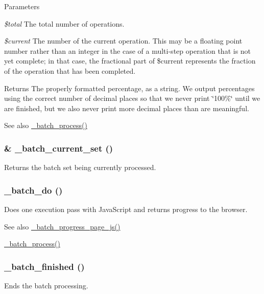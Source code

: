 \begin{DoxyParams}{Parameters}
\item[{\em \$total}]The total number of operations. \item[{\em \$current}]The number of the current operation. This may be a floating point number rather than an integer in the case of a multi-\/step operation that is not yet complete; in that case, the fractional part of \$current represents the fraction of the operation that has been completed.\end{DoxyParams}
\begin{DoxyReturn}{Returns}
The properly formatted percentage, as a string. We output percentages using the correct number of decimal places so that we never print \char`\"{}100\%\char`\"{} until we are finished, but we also never print more decimal places than are meaningful.
\end{DoxyReturn}
\begin{DoxySeeAlso}{See also}
\hyperlink{batch_8inc_af411ff0cae660684809c5f6a8dbc0353}{\_\-batch\_\-process()} 
\end{DoxySeeAlso}
\hypertarget{batch_8inc_a1a536764a1a9bf283bcceddc03b462d7}{
\subsubsection[{\_\-batch\_\-current\_\-set}]{\setlength{\rightskip}{0pt plus 5cm}\& \_\-batch\_\-current\_\-set ()}}
\label{batch_8inc_a1a536764a1a9bf283bcceddc03b462d7}
Returns the batch set being currently processed. \hypertarget{batch_8inc_a200def74deec79748ee5accf5117db6d}{
\subsubsection[{\_\-batch\_\-do}]{\setlength{\rightskip}{0pt plus 5cm}\_\-batch\_\-do ()}}
\label{batch_8inc_a200def74deec79748ee5accf5117db6d}
Does one execution pass with JavaScript and returns progress to the browser.

\begin{DoxySeeAlso}{See also}
\hyperlink{batch_8inc_ac8152d29181479967c4bdc7e0caf920e}{\_\-batch\_\-progress\_\-page\_\-js()} 

\hyperlink{batch_8inc_af411ff0cae660684809c5f6a8dbc0353}{\_\-batch\_\-process()} 
\end{DoxySeeAlso}
\hypertarget{batch_8inc_a7e7b4cbc351842ca1b27cc780b0f219b}{
\subsubsection[{\_\-batch\_\-finished}]{\setlength{\rightskip}{0pt plus 5cm}\_\-batch\_\-finished ()}}
\label{batch_8inc_a7e7b4cbc351842ca1b27cc780b0f219b}
Ends the batch processing.

